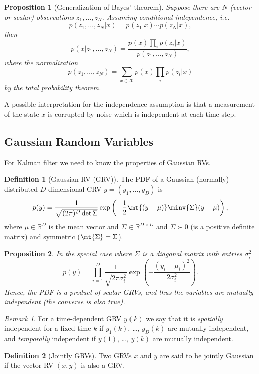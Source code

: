 \documentclass[]{hsrzf}
\theoremstyle{plain}
\newtheorem{prop}{Proposition}[section]
\theoremstyle{definition}
\newtheorem{defn}{Definition}[section]
\theoremstyle{remark}
\newtheorem*{remark}{Remark}
\begin{document}
\begin{prop}[Generalization of Bayes' theorem]
  Suppose there are $N$ (vector or scalar) observations $z_1, \ldots, z_N$.
  Assuming conditional independence, i.e.
  \[
    p(z_1, \ldots, z_N|x) = p(z_1|x) \cdots p(z_N|x),
  \]
  then
  \[
    p(x|z_1, \ldots, z_N) 
      = \frac{p(x) \prod_i p(z_i | x)}{p(z_1, \ldots, z_N)},
  \]
  where the normalization
  \[
    p(z_1, \ldots, z_N) = \sum_{x \in \mathcal{X}} p(x) \prod_i p(z_i | x)
  \]
  by the total probability theorem.
\end{prop}
A possible interpretation for the independence assumption is that a
measurement of the state $x$ is corrupted by noise which is independent at
each time step.

\subsection{Gaussian Random Variables}

For Kalman filter we need to know the properties of Gaussian RVs.

\begin{defn}[Gaussian RV (GRV)]
  The PDF of a Gaussian (normally) distributed $D$-dimensional CRV $y = (y_1,
  \ldots, y_D)$ is
  \[
    p(y) = \frac{1}{\sqrt{(2\pi)^D \det \Sigma}} \exp \left( 
        -\frac{1}{2} \mt{(y - \mu)} \minv{\Sigma} (y - \mu)
      \right),
  \]
  where $\mu \in \mathbb{R}^D$ is the mean vector and $\Sigma \in
  \mathbb{R}^{D\times D}$ and $\Sigma \succ 0$ (is a 
  positive definite matrix) and symmetric ($\mt{\Sigma} = \Sigma$).
\end{defn}

\begin{prop}
  In the special case where $\Sigma$ is a diagonal matrix with entries
  $\sigma^2_i$
  \[
    p(y) = \prod_{i=1}^D \frac{1}{\sqrt{2\pi \sigma^2_i}}
      \exp\left(-\frac{(y_i - \mu_i)^2}{2\sigma^2_i}\right).
  \]
  Hence, the PDF is a product of scalar GRVs, and thus the variables are
  mutually independent (the converse is also true).
\end{prop}

\begin{remark}
  For a time-dependent GRV $y(k)$ we say that it is \emph{spatially}
  independent for a fixed time $k$ if $y_1(k)$, \dots, $y_D(k)$ are
  mutually independent, and \emph{temporally} independent if $y(1)$, \dots,
  $y(k)$ are mutually independent.
\end{remark}

\begin{defn}[Jointly GRVs]
  Two GRVs $x$ and $y$ are said to be jointly Gaussian if the vector RV $(x,
  y)$ is also a GRV.
\end{defn}
\end{document}
